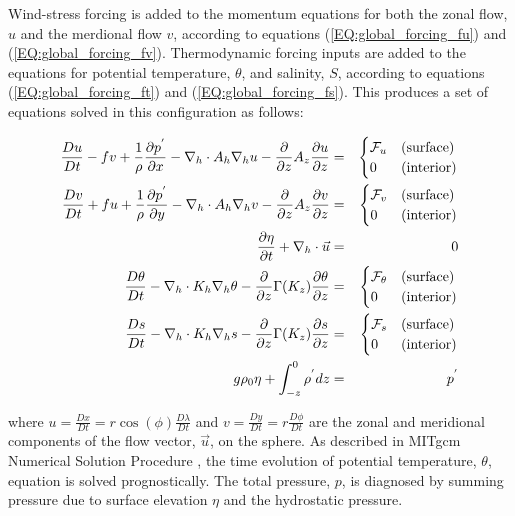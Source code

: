 {Wind-stress forcing is added to the momentum equations for both
the zonal flow, $u$ and the merdional flow $v$, according to equations 
(\ref{EQ:global_forcing_fu}) and (\ref{EQ:global_forcing_fv}).
Thermodynamic forcing inputs are added to the equations for
potential temperature, $\theta$, and salinity, $S$, according to equations 
(\ref{EQ:global_forcing_ft}) and (\ref{EQ:global_forcing_fs}).
This produces a set of equations solved in this configuration as follows:

\begin{eqnarray}
\label{EQ:model_equations}
\frac{Du}{Dt} - fv + 
  \frac{1}{\rho}\frac{\partial p^{'}}{\partial x} - 
  \nabla_{h}\cdot A_{h}\nabla_{h}u - 
  \frac{\partial}{\partial z}A_{z}\frac{\partial u}{\partial z} 
 & = &
\begin{cases}
{\cal F}_u & \text{(surface)} \\
0 & \text{(interior)}
\end{cases}
\\
\frac{Dv}{Dt} + fu + 
  \frac{1}{\rho}\frac{\partial p^{'}}{\partial y} - 
  \nabla_{h}\cdot A_{h}\nabla_{h}v - 
  \frac{\partial}{\partial z}A_{z}\frac{\partial v}{\partial z} 
& = &
\begin{cases}
{\cal F}_v & \text{(surface)} \\
0 & \text{(interior)}
\end{cases}
\\
\frac{\partial \eta}{\partial t} + \nabla_{h}\cdot \vec{u}
&=&
0
\\
\frac{D\theta}{Dt} -
 \nabla_{h}\cdot K_{h}\nabla_{h}\theta
 - \frac{\partial}{\partial z}\Gamma(K_{z})\frac{\partial\theta}{\partial z} 
& = &
\begin{cases}
{\cal F}_\theta & \text{(surface)} \\
0 & \text{(interior)}
\end{cases}
\\
\frac{D s}{Dt} -
 \nabla_{h}\cdot K_{h}\nabla_{h}s
 - \frac{\partial}{\partial z}\Gamma(K_{z})\frac{\partial s}{\partial z} 
& = &
\begin{cases}
{\cal F}_s & \text{(surface)} \\
0 & \text{(interior)}
\end{cases}
\\
g\rho_{0} \eta + \int^{0}_{-z}\rho^{'} dz & = & p^{'}
\end{eqnarray}

\noindent where $u=\frac{Dx}{Dt}=r \cos(\phi)\frac{D \lambda}{Dt}$ and 
$v=\frac{Dy}{Dt}=r \frac{D \phi}{Dt}$ 
are the zonal and meridional components of the
flow vector, $\vec{u}$, on the sphere. As described in
MITgcm Numerical Solution Procedure \cite{MITgcm_Numerical_Scheme}, the time 
evolution of potential temperature, $\theta$, equation is solved prognostically.
The total pressure, $p$, is diagnosed by summing pressure due to surface 
elevation $\eta$ and the hydrostatic pressure.
\\

}
